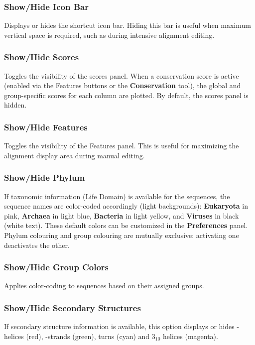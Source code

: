 \documentclass[a4paper]{article}
\begin{document}
\subsubsection{Show/Hide Icon Bar}
Displays or hides the shortcut icon bar. Hiding this bar is useful when maximum vertical space is required, such as during intensive alignment editing.

\subsubsection{Show/Hide Scores}
Toggles the visibility of the scores panel. When a conservation score is active (enabled via the Features buttons or the \textbf{Conservation} tool), the global and group-specific scores for each column are plotted. By default, the scores panel is hidden.

\subsubsection{Show/Hide Features}
Toggles the visibility of the Features panel. This is useful for maximizing the alignment display area during manual editing.

\subsubsection{Show/Hide Phylum}
If taxonomic information (Life Domain) is available for the sequences, the sequence names are color-coded accordingly (light backgrounds): \textbf{Eukaryota} in pink, \textbf{Archaea} in light blue, \textbf{Bacteria} in light yellow, and \textbf{Viruses} in black (white text). These default colors can be customized in the \textbf{Preferences} panel. Phylum colouring and group colouring are mutually exclusive: activating one deactivates the other.

\subsubsection{Show/Hide Group Colors}
Applies color-coding to sequences based on their assigned groups.

\subsubsection{Show/Hide Secondary Structures}
If secondary structure information is available, this option displays or hides \textalpha-helices (red), \textbeta-strands (green), turns (cyan) and $3_{10}$ helices (magenta).
\end{document}
